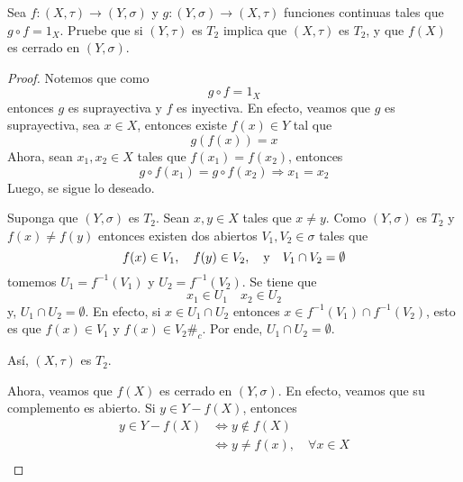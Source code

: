 \documentclass[12pt]{report}
\theoremstyle{largebreak}
\newcommand\cf[3]{\ensuremath{#1:#2\rightarrow#3}}
\newcommand\contradiction{\ensuremath{\#_c}}
\begin{document}
    \begin{excer}
        Sea $\cf{f}{(X,\tau)}{(Y,\sigma)}$ y $\cf{g}{(Y,\sigma)}{(X,\tau)}$ funciones continuas tales que $g\circ f=1_X$. Pruebe que si $(Y,\tau)$ es $T_2$ implica que $(X,\tau)$ es $T_2$, y que $f(X)$ es cerrado en $(Y,\sigma)$.
    \end{excer}

    \begin{proof}
        Notemos que como
        \begin{equation*}
            g\circ f=1_X
        \end{equation*}
        entonces $g$ es suprayectiva y $f$ es inyectiva. En efecto, veamos que $g$ es suprayectiva, sea $x\in X$, entonces existe $f(x)\in Y$ tal que
        \begin{equation*}
            g(f(x))=x
        \end{equation*}
        Ahora, sean $x_1,x_2\in X$ tales que $f(x_1)=f(x_2)$, entonces
        \begin{equation*}
            g\circ f(x_1)=g\circ f(x_2)\Rightarrow x_1=x_2
        \end{equation*}
        Luego, se sigue lo deseado.

        Suponga que $(Y,\sigma)$ es $T_2$. Sean $x,y\in X$ tales que $x\neq y$. Como $(Y,\sigma)$ es $T_2$ y $f(x)\neq f(y)$ entonces existen dos abiertos $V_1,V_2\in\sigma$ tales que
        \begin{equation*}
            f(x)\in V_1,\quad f(y)\in V_2,\quad\textup{y}\quad V_1\cap V_2=\emptyset
        \end{equation*}
        tomemos $U_1=f^{-1}(V_1)$ y $U_2=f^{-1}(V_2)$. Se tiene que
        \begin{equation*}
            x_1\in U_1\quad x_2\in U_2
        \end{equation*}
        y, $U_1\cap U_2=\emptyset$. En efecto, si $x\in U_1\cap U_2$ entonces $x\in f^{-1}(V_1)\cap f^{-1}(V_2)$, esto es que $f(x)\in V_1$ y $f(x)\in V_2$\contradiction. Por ende, $U_1\cap U_2=\emptyset$.

        Así, $(X,\tau)$ es $T_2$.

        Ahora, veamos que $f(X)$ es cerrado en $(Y,\sigma)$. En efecto, veamos que su complemento es abierto. Si $y\in Y-f(X)$, entonces
        \begin{equation*}
            \begin{split}
                y\in Y-f(X)&\iff y\notin f(X)\\
                &\iff y\neq f(x),\quad\forall 
                x\in X\\
            \end{split}
        \end{equation*}
    \end{proof}
\end{document}
